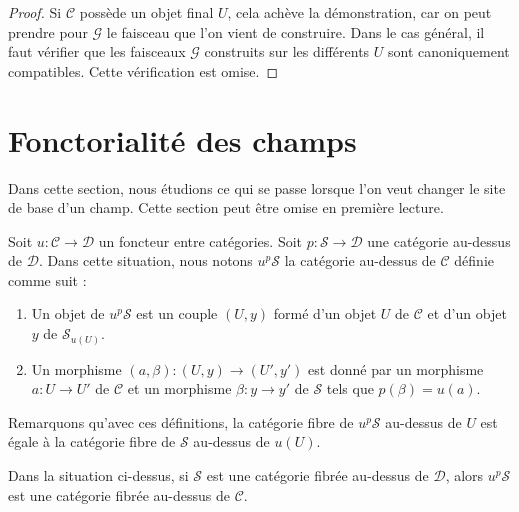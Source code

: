 \begin{proof}
\medskip\noindent
Si $\mathcal{C}$ possède un objet final $U$, cela achève la démonstration,
car on peut prendre pour $\mathcal{G}$ le faisceau que l'on vient de construire.
Dans le cas général, il faut vérifier que les faisceaux $\mathcal{G}$
construits sur les différents $U$ sont canoniquement compatibles.
Cette vérification est omise.
\end{proof}




\section{Fonctorialité des champs}
\label{section-inverse-image}

\noindent
Dans cette section, nous étudions ce qui se passe lorsque l'on veut changer
le site de base d'un champ. Cette section peut être omise en première lecture.

\medskip\noindent
Soit $u : \mathcal{C} \to \mathcal{D}$ un foncteur entre catégories.
Soit $p : \mathcal{S} \to \mathcal{D}$ une catégorie au-dessus de $\mathcal{D}$.
Dans cette situation, nous notons $u^p\mathcal{S}$ la catégorie au-dessus de $\mathcal{C}$
définie comme suit :
\begin{enumerate}
\item Un objet de $u^p\mathcal{S}$ est un couple $(U, y)$ formé
d'un objet $U$ de $\mathcal{C}$ et d'un objet $y$ de $\mathcal{S}_{u(U)}$.
\item Un morphisme $(a, \beta) : (U, y) \to (U', y')$ est donné par
un morphisme $a : U \to U'$ de $\mathcal{C}$ et un morphisme $\beta : y \to y'$
de $\mathcal{S}$ tels que $p(\beta) = u(a)$.
\end{enumerate}
Remarquons qu'avec ces définitions, la catégorie fibre de
$u^p\mathcal{S}$ au-dessus de $U$ est égale à la catégorie fibre de
$\mathcal{S}$ au-dessus de $u(U)$.

\begin{lemma}
\label{lemma-fibred-category-pushforward}
Dans la situation ci-dessus, si $\mathcal{S}$ est une catégorie fibrée au-dessus de
$\mathcal{D}$, alors $u^p\mathcal{S}$ est une catégorie fibrée au-dessus de $\mathcal{C}$.
\end{lemma}

